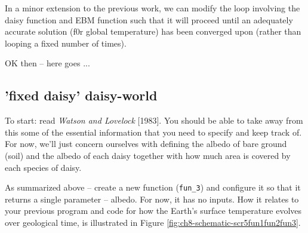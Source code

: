 \documentclass{tufte-book} %
\begin{document}
\begin{description}[align=right]
\item [6.2.4] In a minor extension to the previous work, we can modify the loop involving  the daisy function and EBM function such that it will proceed until an adequately accurate solution (f0r global temperature) has been converged upon (rather than looping a fixed number of times).  

\end{description}

OK then -- here goes ...


\subsection{'fixed daisy' daisy-world}

To start: read \textit{Watson and Lovelock} [1983]. You should be able to take away from this some of the essential information that you need to specify and keep track of. For now, we'll just concern ourselves with defining the albedo of bare ground (soil) and the albedo of each daisy together with how much area is covered by each species of daisy.

As summarized above -- create a new function (\texttt{fun\_3}) and configure it so that it returns a single parameter -- albedo. For now, it has no inputs. How it relates to your previous program and code for how the Earth's surface temperature evolves over geological time, is illustrated in Figure \ref{fig:ch8-schematic-scr5fun1fun2fun3}.
\end{document}
